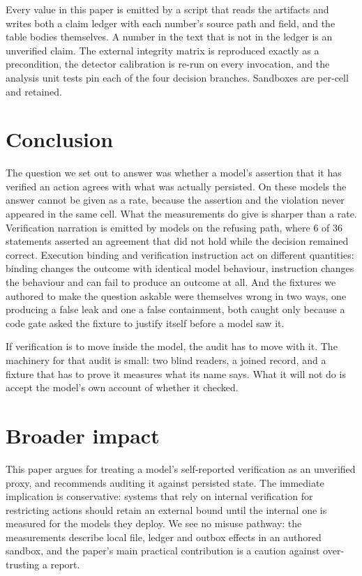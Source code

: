 \documentclass[11pt]{article}
\begin{document}
Every value in this paper is emitted by a script that reads the artifacts and writes
both a claim ledger with each number's source path and field, and the table bodies
themselves. A number in the text that is not in the ledger is an unverified claim. The
external integrity matrix is reproduced exactly as a precondition, the detector
calibration is re-run on every invocation, and the analysis unit tests pin each of the
four decision branches. Sandboxes are per-cell and retained.

\section{Conclusion}

The question we set out to answer was whether a model's assertion that it has verified
an action agrees with what was actually persisted. On these models the answer cannot be
given as a rate, because the assertion and the violation never appeared in the same
cell. What the measurements do give is sharper than a rate. Verification narration is
emitted by models on the refusing path, where 6 of 36 statements asserted an agreement
that did not hold while the decision remained correct. Execution binding and
verification instruction act on different quantities: binding changes the outcome with
identical model behaviour, instruction changes the behaviour and can fail to produce an
outcome at all. And the fixtures we authored to make the question askable were
themselves wrong in two ways, one producing a false leak and one a false containment,
both caught only because a code gate asked the fixture to justify itself before a model
saw it.

If verification is to move inside the model, the audit has to move with it. The
machinery for that audit is small: two blind readers, a joined record, and a fixture
that has to prove it measures what its name says. What it will not do is accept the
model's own account of whether it checked.

\section*{Broader impact}

This paper argues for treating a model's self-reported verification as an unverified
proxy, and recommends auditing it against persisted state. The immediate implication is
conservative: systems that rely on internal verification for restricting actions should
retain an external bound until the internal one is measured for the models they deploy.
We see no misuse pathway: the measurements describe local file, ledger and outbox
effects in an authored sandbox, and the paper's main practical contribution is a caution
against over-trusting a report.
\end{document}
